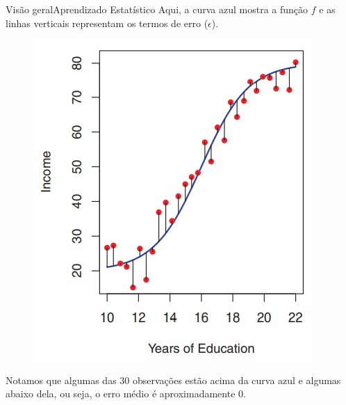 \documentclass[t]{beamer}
\begin{document}
\begin{ftst}{Visão geral}{{Aprendizado Estatístico}}
\justifying
Aqui, a curva azul mostra a função $f$ e as linhas verticais representam os termos de erro ($\epsilon$).

\begin{figure}
    \centering
    \includegraphics[scale=0.3]{Figuras/slide03_06.jpg}
\end{figure}

Notamos que algumas das 30 observações estão acima da curva azul e algumas abaixo dela, ou seja, o erro médio é aproximadamente 0.


\end{ftst}

\end{document}
